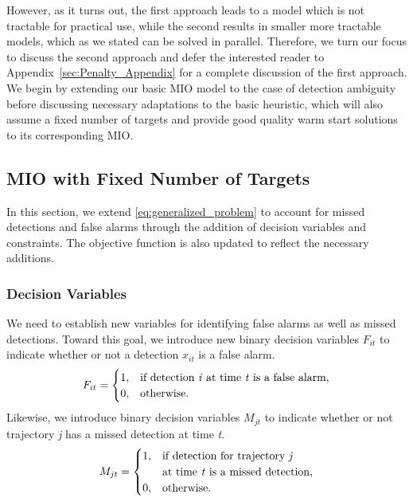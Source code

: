 However, as it turns out, the first approach leads to a model which is not tractable for practical use, while the second results in smaller more tractable models, which as we stated can be solved in parallel.
Therefore, we turn our focus to discuss the second approach and defer the interested reader to Appendix~\ref{sec:Penalty_Appendix} for a complete discussion of the first approach. We begin by extending our basic MIO model to the case of detection ambiguity before discussing necessary adaptations to the basic heuristic, which will also assume a fixed number of targets and provide good quality warm start solutions to its corresponding MIO. 

\subsection{MIO with Fixed Number of Targets}
In this section, we extend \eqref{eq:generalized_problem} to account for missed detections and false alarms through the addition of decision variables and constraints. The objective function is also updated to reflect the necessary additions. 

\subsubsection{Decision Variables}
We need to establish new variables for identifying false alarms as well as missed detections. Toward this goal, we introduce new binary decision variables $F_{it}$ to indicate whether or not a detection $x_{it}$ is a false alarm. 
\[F_{it} = 
\begin{cases}
1, & \text{if detection \textit{i} at time \textit{t} is a false alarm,}\\
0, & \text{otherwise.}
\end{cases}\]
Likewise, we introduce binary decision variables $M_{jt}$ to indicate whether or not trajectory \textit{j} has a missed detection at time \textit{t}.
\[M_{jt} =
\begin{cases}
1, & \text{if detection for trajectory \textit{j}}\\
   &\text{at time \textit{t} is a missed detection,}\\
0, & \text{otherwise.}
\end{cases}\]

